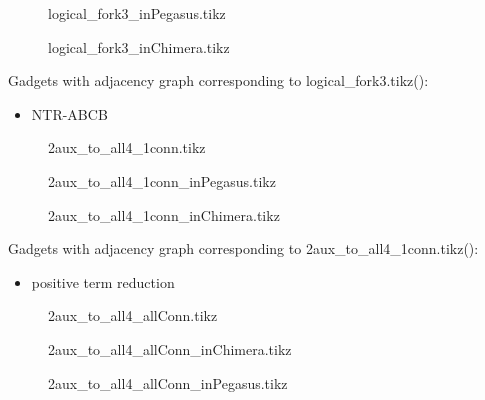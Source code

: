 \documentclass{article}
\begin{document}
\begin{figure}

\caption{logical\_fork3\_inPegasus.tikz}
\end{figure}

\begin{figure}

\caption{logical\_fork3\_inChimera.tikz}
\end{figure}

Gadgets with adjacency graph corresponding to logical\_fork3.tikz(\scalebox{.25}{}):

\begin{itemize}
\item NTR-ABCB
\end{itemize}

\begin{figure}

\caption{2aux\_to\_all4\_1conn.tikz}
\end{figure}

\begin{figure}

\caption{2aux\_to\_all4\_1conn\_inPegasus.tikz}
\end{figure}

\begin{figure}

\caption{2aux\_to\_all4\_1conn\_inChimera.tikz}
\end{figure}

Gadgets with adjacency graph corresponding to 2aux\_to\_all4\_1conn.tikz(\scalebox{.25}{}):

\begin{itemize}
\item positive term reduction
\end{itemize}

\begin{figure}

\caption{2aux\_to\_all4\_allConn.tikz}
\end{figure}

\begin{figure}

\caption{2aux\_to\_all4\_allConn\_inChimera.tikz}
\end{figure}


\begin{figure}

\caption{2aux\_to\_all4\_allConn\_inPegasus.tikz}
\end{figure}
\end{document}
